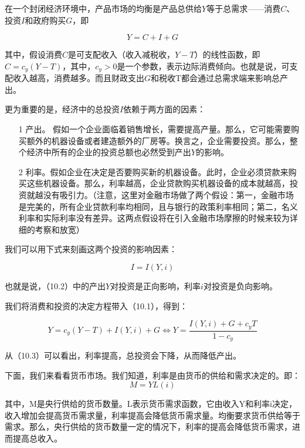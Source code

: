 \documentclass[cn,12pt,math=newtx,citestyle=gb7714-2015,bibstyle=gb7714-2015]{elegantbook}
\begin{document}
	在一个封闭经济环境中，产品市场的均衡是产品总供给$Y$等于总需求——消费$C$、投资$I$和政府购买$G$，即
	
	\begin{equation}
		Y = C + I + G
	\end{equation}
	
	其中，假设消费$C$是可支配收入（收入减税收，$Y-T$）的线性函数，即$C=c_y (Y-T)$，其中，$c_y>0$是一个参数，表示边际消费倾向。也就是说，可支配收入越高，消费越多。而且财政支出$G$和税收T都会通过总需求端来影响总产出。
	
	更为重要的是，经济中的总投资$I$依赖于两方面的因素：
	
	\begin{itemize}
		\item [1] 产出。 假如一个企业面临着销售增长，需要提高产量。那么，它可能需要购买额外的机器设备或者建造额外的厂房等。换言之，企业需要投资。那么，整个经济中所有的企业的投资总额也必然受到产出$Y$的影响。
		\item [2] 利率。假如企业在决定是否要购买新的机器设备。此时，企业必须贷款来购买这些机器设备。那么，利率越高，企业贷款购买机器设备的成本就越高，投资就越没有吸引力。（注意，这里对金融市场做了两个假设：第一，金融市场是完美的，所有企业贷款利率均相同，且与银行的政策利率相同；第二，名义利率和实际利率没有差异。这两点假设将在引入金融市场摩擦的时候来较为详细的考察和放宽）
	\end{itemize}
	
	我们可以用下式来刻画这两个投资的影响因素：
	
	\begin{equation}
		I = I(Y,i)
	\end{equation}
	
	也就是说，（10.2）中的产出$Y$对投资是正向影响，利率$i$对投资是负向影响。
	
	我们将消费和投资的决定方程带入（10.1），得到：
	
	\begin{equation}
		Y = c_y(Y-T) + I(Y,i) + G  \Leftrightarrow  Y = \frac{I(Y,i)+G+c_y T}{1-c_y}
	\end{equation}

从（10.3）可以看出，利率提高，总投资会下降，从而降低产出。

下面，我们来看看货币市场。我们知道，利率是由货币的供给和需求决定的。即：
\begin{equation}
	M =Y L(i)
\end{equation}
	
	其中，M是央行供给的货币数量。L表示货币需求函数，它由收入Y和利率i决定，收入增加会提高货币需求量，利率提高会降低货币需求量。均衡要求货币供给等于需求。那么，央行供给的货币数量一定的情况下，利率的提高会降低货币需求，进而提高总收入。
	
\end{document}
